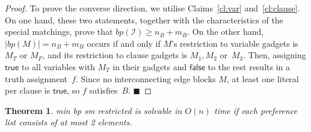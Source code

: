 \documentclass[preprint,12pt]{elsarticle}
\newcommand{\myqed}{$\blacksquare$}
\newtheorem{theorem}{Theorem}[section]
\newcommand{\true}{\mathsf{true}}
\newcommand{\false}{\mathsf{false}}
\begin{document}
\begin{proof}
	To prove the converse direction, we utilise Claims~\ref{cl:var} and~\ref{cl:clause}. On one hand, these two statements, together with the characteristics of the special matchings, prove that $bp(\mathcal{I}) \geq n_B + m_B$. On the other hand, $|bp(M)| = n_B + m_B$ occurs if and only if $M$'s restriction to variable gadgets is $M_T$ or $M_F$, and its restriction to clause gadgets is $M_1, M_2$ or~$M_3$. Then, assigning $\true$ to all variables with $M_T$ in their gadgets and $\false$ to the rest results in a truth assignment~$f$. Since no interconnecting edge blocks $M$, at least one literal per clause is $\true$, so $f$ satisfies~$B$. \myqed
\end{proof}

\begin{theorem}
\label{th:minbp22}
	{\sc min bp sm restricted} is solvable in $O(n)$ time if each preference list consists of at most 2 elements.
\end{theorem}
\end{document}
